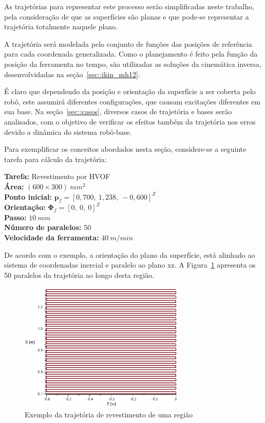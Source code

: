 As trajetórias para representar este processo serão simplificadas neste
trabalho, pela consideração de que as superfícies são planas e que pode-se
representar a trajetória totalmente naquele plano.

A trajetória será modelada pelo conjunto de funções das posições de referência
para cada coordenada generalizada. Como o planejamento é feito pela função da
posição da ferramenta no tempo, são utilizadas as soluções da cinemática
inversa, desenvolvidadas na seção~\ref{sec::ikin_mh12}.

É claro que dependendo da posição e orientação da superfície a ser coberta pelo
robô, este assumirá diferentes configurações, que causam excitações diferentes
em sua base. Na seção~\ref{sec::casos}, diversos casos de trajetória e bases
serão analisados, com o objetivo de verificar os efeitos também da trajetória
nos erros devido a dinâmica do sistema robô-base. 

Para exemplificar os conceitos abordados nesta seção, considere-se a seguinte
tarefa para cálculo da trajetória:
%
\newline
\begin{tcolorbox}
[colframe=black!75!white, colback=white, title = Trajetória -Exemplo] 
  \textbf{Tarefa:} Revestimento por HVOF \\
  \textbf{Área:} $(600 \times 300)~mm^2$ \\
  \textbf{Ponto inicial:} $\mathbf{p}_f = [0,700,~1,238,~-0,600]^Z$ \\
  \textbf{Orientação:} $\boldsymbol{\Phi}_{f} = [0,~0,~0]^Z$ \\
  \textbf{Passo:} $10~mm$ \\
  \textbf{Número de paralelos:} 50 \\
  \textbf{Velocidade da ferramenta:} $40~m/min$
\end{tcolorbox}
%
De acordo com o exemplo, a orientação do plano da superfície,
está alinhado ao sistema de coordenadas inercial e paralelo ao plano xz. A
Figura~\ref{fig::trajec_600x500x10} apresenta os 50 paralelos da trajetória ao
longo desta região.

\begin{figure}[h]
	\centering 
 	\includegraphics[width=0.70\textwidth]{figs/trajec_600x500x10}
 	\caption{Exemplo da trajetória de revestimento de uma região}
 	\label{fig::trajec_600x500x10}
\end{figure}

